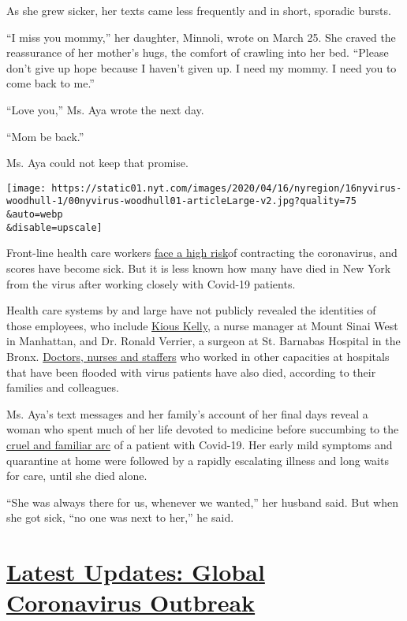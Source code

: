 As she grew sicker, her texts came less frequently and in short,
sporadic bursts.

``I miss you mommy,'' her daughter, Minnoli, wrote on March 25. She
craved the reassurance of her mother's hugs, the comfort of crawling
into her bed. ``Please don't give up hope because I haven't given up. I
need my mommy. I need you to come back to me.''

``Love you,'' Ms. Aya wrote the next day.

``Mom be back.''

Ms. Aya could not keep that promise.

\texttt{[image: https://static01.nyt.com/images/2020/04/16/nyregion/16nyvirus-woodhull-1/00nyvirus-woodhull01-articleLarge-v2.jpg?quality=75\\\&auto=webp\\\&disable=upscale]}

Front-line health care workers
\href{https://www.nytimes.com/2020/03/30/nyregion/ny-coronavirus-doctors-sick.html}{face
a high risk}of contracting the coronavirus, and scores have become sick.
But it is less known how many have died in New York from the virus after
working closely with Covid-19 patients.

Health care systems by and large have not publicly revealed the
identities of those employees, who include
\href{https://www.nytimes.com/2020/03/26/nyregion/nurse-dies-coronavirus-mount-sinai.html}{Kious
Kelly}, a nurse manager at Mount Sinai West in Manhattan, and Dr. Ronald
Verrier, a surgeon at St. Barnabas Hospital in the Bronx.
\href{https://www.nytimes.com/2020/04/27/world/americas/health-workers-attacked.html}{Doctors,
nurses and staffers} who worked in other capacities at hospitals that
have been flooded with virus patients have also died, according to their
families and colleagues.

Ms. Aya's text messages and her family's account of her final days
reveal a woman who spent much of her life devoted to medicine before
succumbing to the
\href{https://www.nytimes.com/2020/04/13/nyregion/coronavirus-nyc-doctors.html}{cruel
and familiar arc} of a patient with Covid-19. Her early mild symptoms
and quarantine at home were followed by a rapidly escalating illness and
long waits for care, until she died alone.

``She was always there for us, whenever we wanted,'' her husband said.
But when she got sick, ``no one was next to her,'' he said.

\hypertarget{latest-updates-global-coronavirus-outbreak}{%
\section{\texorpdfstring{\href{https://www.nytimes.com/2020/08/04/world/coronavirus-cases.html?action=click\&pgtype=Article\&state=default\&region=MAIN_CONTENT_1\&context=storylines_live_updates}{Latest
Updates: Global Coronavirus
Outbreak}}{Latest Updates: Global Coronavirus Outbreak}}\label{latest-updates-global-coronavirus-outbreak}}


